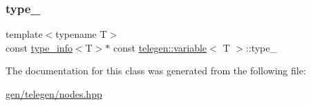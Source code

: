 \subsubsection{\texorpdfstring{type\+\_\+}{type\_}}
{\footnotesize\ttfamily template$<$typename T$>$ \\
const \hyperlink{structtelegen_1_1type__info}{type\+\_\+info}$<$T$>$$\ast$ const \hyperlink{classtelegen_1_1variable}{telegen\+::variable}$<$ T $>$\+::type\+\_\+\hspace{0.3cm}{\ttfamily [protected]}}



The documentation for this class was generated from the following file\+:\begin{DoxyCompactItemize}
\item 
\hyperlink{gen_2telegen_2nodes_8hpp}{gen/telegen/nodes.\+hpp}\end{DoxyCompactItemize}
